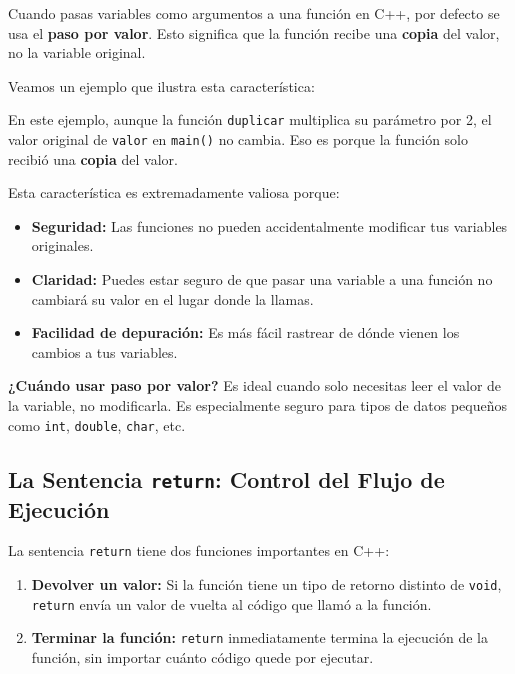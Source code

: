 Cuando pasas variables como argumentos a una función en C++, por defecto se usa el \textbf{paso por valor}. Esto significa que la función recibe una \textbf{copia} del valor, no la variable original.

Veamos un ejemplo que ilustra esta característica:



En este ejemplo, aunque la función \texttt{duplicar} multiplica su parámetro por 2, el valor original de \texttt{valor} en \texttt{main()} no cambia. Eso es porque la función solo recibió una \textbf{copia} del valor.

Esta característica es extremadamente valiosa porque:

\begin{itemize}
    \item \textbf{Seguridad:} Las funciones no pueden accidentalmente modificar tus variables originales.
    \item \textbf{Claridad:} Puedes estar seguro de que pasar una variable a una función no cambiará su valor en el lugar donde la llamas.
    \item \textbf{Facilidad de depuración:} Es más fácil rastrear de dónde vienen los cambios a tus variables.
\end{itemize}

\textbf{¿Cuándo usar paso por valor?} Es ideal cuando solo necesitas leer el valor de la variable, no modificarla. Es especialmente seguro para tipos de datos pequeños como \texttt{int}, \texttt{double}, \texttt{char}, etc.

\subsection{La Sentencia \texttt{return}: Control del Flujo de Ejecución}
\label{subsec:sentencia_return}

La sentencia \texttt{return} tiene dos funciones importantes en C++:

\begin{enumerate}
    \item \textbf{Devolver un valor:} Si la función tiene un tipo de retorno distinto de \texttt{void}, \texttt{return} envía un valor de vuelta al código que llamó a la función.
    \item \textbf{Terminar la función:} \texttt{return} inmediatamente termina la ejecución de la función, sin importar cuánto código quede por ejecutar.
\end{enumerate}

